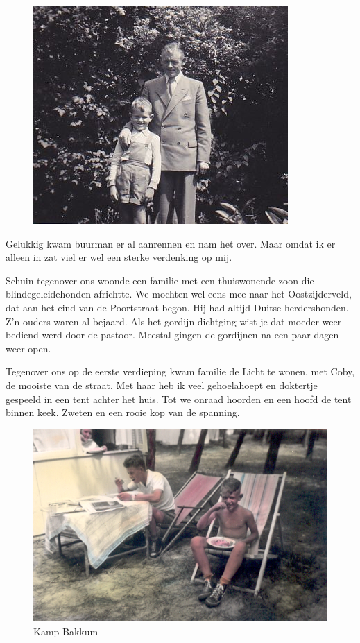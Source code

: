 \documentclass[12pt,twoside, openright]{memoir}
\begin{document}
\begin{figure}
\centering
\includegraphics[width=\textwidth]{img/ch5/indetuin}
\caption*{\footnotesize }
\end{figure}

Gelukkig kwam buurman er al aanrennen en nam het over. Maar omdat ik er alleen in zat viel er wel een sterke verdenking op mij. 

Schuin tegenover ons woonde een familie met een thuiswonende zoon die blindegeleidehonden africhtte. We mochten wel eens mee naar het Oostzijderveld, dat aan het eind van de Poortstraat begon. Hij had altijd Duitse herdershonden. Z'n ouders waren al bejaard. Als het gordijn dichtging wist je dat moeder weer bediend werd door de pastoor. Meestal gingen de gordijnen na een paar dagen weer open. 

Tegenover ons op de eerste verdieping kwam familie de Licht te wonen, met Coby, de mooiste van de straat. Met haar heb ik veel gehoelahoept en doktertje gespeeld in een tent achter het huis. Tot we onraad hoorden en een hoofd de tent binnen keek. Zweten en een rooie kop van de spanning. 

\begin{figure}
\centering
\includegraphics[width=\textwidth]{img/ch5/Bakkum2}
\caption*{\footnotesize Kamp Bakkum}
\end{figure} 
\end{document}
